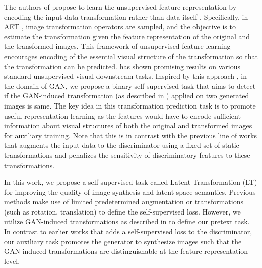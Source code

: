 \documentclass[10pt,twocolumn,letterpaper]{article}
\begin{document}
The authors of \cite{aet2019transformation} propose to learn the unsupervised feature representation by encoding the input data transformation rather than data itself \cite{autoencoder2008icml,autoencoderv1994}. Specifically, in AET \cite{aet2019transformation}, image transformation operators are sampled, and the objective is to estimate the transformation given the feature representation of the original and the transformed images. This framework of unsupervised feature learning encourages encoding of the essential visual structure of the transformation so that the transformation can be predicted. \cite{aet2019transformation} has shown promising results on various standard unsupervised visual downstream tasks. Inspired by this approach \cite{aet2019transformation}, in the domain of GAN, we propose a binary self-supervised task that aims to detect if the GAN-induced transformation (as described in \cite{aet2019transformation}) applied on two generated images is same. The key idea in this transformation prediction task is to promote useful representation learning as the features would have to encode sufficient information about visual structures of both the original and transformed images for auxiliary training. Note that this is in contrast with the previous line of works\cite{crgan2019chen} that augments the input data to the discriminator using a fixed set of static transformations and penalizes the sensitivity of discriminatory features to these transformations.



In this work, we propose a self-supervised task called Latent Transformation (LT) for improving the quality of image synthesis and latent space semantics. Previous methods make use of limited predetermined augmentation or transformations (such as rotation, translation) to define the self-supervised loss. However, we utilize GAN-induced transformations as described in \cite{aet2019transformation} to define our pretext task. In contrast to earlier works \cite{ssganadv2019,fxgan2020wacv} that adds a self-supervised loss to the discriminator, our auxiliary task promotes the generator to synthesize images such that the GAN-induced transformations are distinguishable at the feature representation level. 
\end{document}
